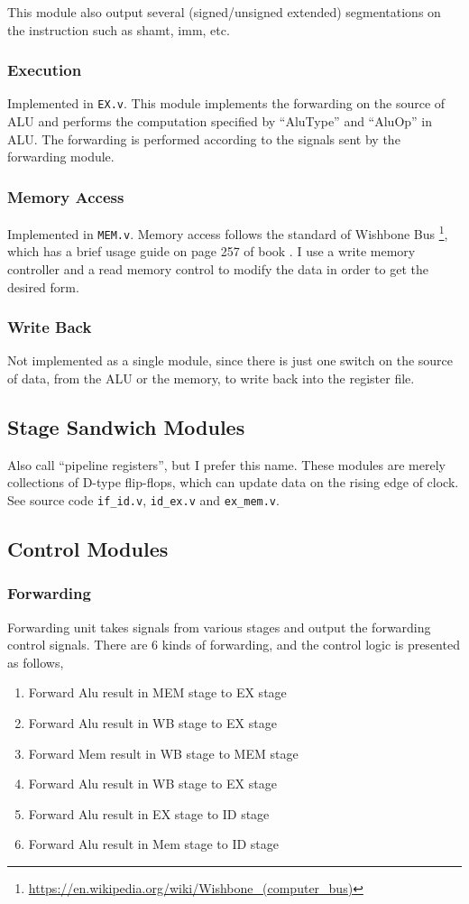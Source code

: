 \documentclass[paper=a4, fontsize=11pt]{scrartcl} %
\numberwithin{equation}{section} %
\numberwithin{figure}{section} %
\numberwithin{table}{section} %
\begin{document}
\begin{spacing}{1.5}
			This module also output several (signed/unsigned extended) segmentations on the instruction such as shamt, imm, etc.
    	\subsubsection{Execution} Implemented in \verb|EX.v|. This module implements the forwarding on the source of ALU and performs the computation specified by ``AluType'' and ``AluOp'' in ALU. The forwarding is performed according to the signals sent by the forwarding module.
    	\subsubsection{Memory Access} Implemented in \verb|MEM.v|. Memory access follows the standard of Wishbone Bus  \footnote{\url{https://en.wikipedia.org/wiki/Wishbone_(computer_bus)}}, which has a brief usage guide on page 257 of book \cite{lsl}. I use a write memory controller and a read memory control to modify the data in order to get the desired form.
    	\subsubsection{Write Back} Not implemented as a single module, since there is just one switch on the source of data, from the ALU or the memory, to write back into the register file.

    \subsection{Stage Sandwich Modules}
    	Also call ``pipeline registers'', but I prefer this name. These modules are merely collections of D-type flip-flops, which can update data on the rising edge of clock. See source code \verb|if_id.v|, \verb|id_ex.v| and \verb|ex_mem.v|.
    \subsection{Control Modules}
    	\subsubsection{Forwarding}
	    	 Forwarding unit takes signals from various stages and output the forwarding control signals. There are 6 kinds of forwarding, and the control logic is presented as follows,
	    	 \begin{enumerate}
	    	 	\item Forward Alu result in MEM stage to EX stage
	    	 	\item Forward Alu result in WB stage to EX stage
	    	 	\item Forward Mem result in WB stage to MEM stage
	    	 	\item Forward Alu result in WB stage to EX stage
	    	 	\item Forward Alu result in EX stage to ID stage
	    	 	\item Forward Alu result in Mem stage to ID stage
	    	 \end{enumerate}

\end{spacing}
\end{document}
